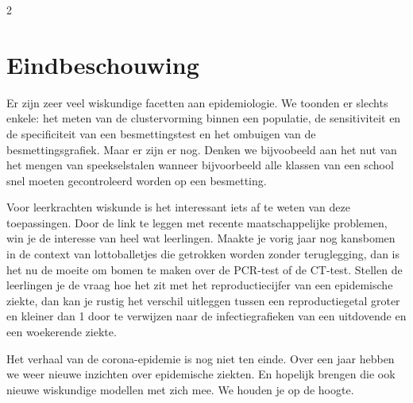 \begin{multicols}{2}
\section{Eindbeschouwing}
Er zijn zeer veel wiskundige facetten aan epidemiologie. We toonden er slechts enkele: het meten van de clustervorming binnen een populatie, de sensitiviteit en de specificiteit van een besmettingstest en het ombuigen van de besmettingsgrafiek. Maar er zijn er nog. Denken we bijvoobeeld aan het nut van het mengen van speekselstalen wanneer bijvoorbeeld alle klassen van een school snel moeten gecontroleerd worden op een besmetting.

Voor leerkrachten wiskunde is het interessant iets af te weten van deze toepassingen. Door de link te leggen met recente maatschappelijke problemen, win je de interesse van heel wat leerlingen. Maakte je vorig jaar nog kansbomen in de context van lottoballetjes die getrokken worden zonder teruglegging, dan is het nu de moeite om bomen te maken over de PCR-test of de CT-test. Stellen de leerlingen je de vraag hoe het zit met het reproductiecijfer van een epidemische ziekte, dan kan je rustig het verschil uitleggen tussen een reproductiegetal groter en kleiner dan 1 door te verwijzen naar de infectiegrafieken van een uitdovende en een woekerende ziekte.

Het verhaal van de corona-epidemie is nog niet ten einde. Over een jaar hebben we weer nieuwe inzichten over epidemische ziekten. En hopelijk brengen die ook nieuwe wiskundige modellen met zich mee. We houden je op de hoogte.

\end{multicols}


\stopcontents[mainsections]			        %


